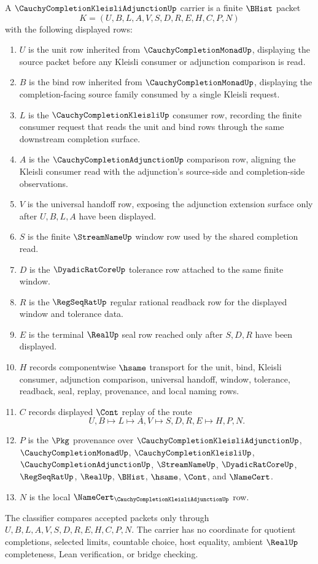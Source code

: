 \begin{definition}
\label{def:cauchy-completion-kleisli-adjunction-carrier}
A $\CauchyCompletionKleisliAdjunctionUp$ carrier is a finite $\BHist$ packet
$$
K=(U,B,L,A,V,S,D,R,E,H,C,P,N)
$$
with the following displayed rows:
\begin{enumerate}
\item $U$ is the unit row inherited from $\CauchyCompletionMonadUp$, displaying the source packet before any Kleisli consumer or adjunction comparison is read.
\item $B$ is the bind row inherited from $\CauchyCompletionMonadUp$, displaying the completion-facing source family consumed by a single Kleisli request.
\item $L$ is the $\CauchyCompletionKleisliUp$ consumer row, recording the finite consumer request that reads the unit and bind rows through the same downstream completion surface.
\item $A$ is the $\CauchyCompletionAdjunctionUp$ comparison row, aligning the Kleisli consumer read with the adjunction's source-side and completion-side observations.
\item $V$ is the universal handoff row, exposing the adjunction extension surface only after $U,B,L,A$ have been displayed.
\item $S$ is the finite $\StreamNameUp$ window row used by the shared completion read.
\item $D$ is the $\DyadicRatCoreUp$ tolerance row attached to the same finite window.
\item $R$ is the $\RegSeqRatUp$ regular rational readback row for the displayed window and tolerance data.
\item $E$ is the terminal $\RealUp$ seal row reached only after $S,D,R$ have been displayed.
\item $H$ records componentwise $\hsame$ transport for the unit, bind, Kleisli consumer, adjunction comparison, universal handoff, window, tolerance, readback, seal, replay, provenance, and local naming rows.
\item $C$ records displayed $\Cont$ replay of the route
$$
U,B \longmapsto L \longmapsto A,V \longmapsto S,D,R,E \longmapsto H,P,N .
$$
\item $P$ is the $\Pkg$ provenance over $\CauchyCompletionKleisliAdjunctionUp$, $\CauchyCompletionMonadUp$, $\CauchyCompletionKleisliUp$, $\CauchyCompletionAdjunctionUp$, $\StreamNameUp$, $\DyadicRatCoreUp$, $\RegSeqRatUp$, $\RealUp$, $\BHist$, $\hsame$, $\Cont$, and $\NameCert$.
\item $N$ is the local $\NameCert_{\CauchyCompletionKleisliAdjunctionUp}$ row.
\end{enumerate}
The classifier compares accepted packets only through $U,B,L,A,V,S,D,R,E,H,C,P,N$. The carrier has no coordinate for quotient completions, selected limits, countable choice, host equality, ambient $\RealUp$ completeness, Lean verification, or bridge checking.
\end{definition}

